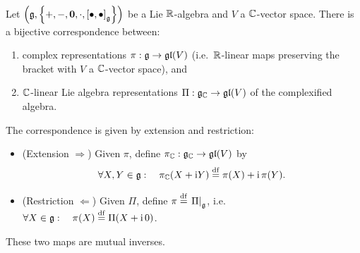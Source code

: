 \documentclass[11pt,reqno]{amsart}
\newcommand{\ii}{\mathrm{i}}
\begin{document}
\begin{Prop}\label{prop:complex-rep-equivalence}
Let $\Br{\g,\set{+,-,\bm0,\cdot,\SqBr{\bullet,\bullet}_\g}}$ be a Lie $\mathbb{R}$-algebra
and $V$ a $\mathbb{C}$-vector space.
There is a bijective correspondence between:
\begin{enumerate}
\item complex representations $\pi:\mathfrak{g}\to\mathfrak{gl}(V)$ (i.e.\ $\mathbb{R}$-linear maps
preserving the bracket with $V$ a $\mathbb{C}$-vector space), and
\item $\mathbb{C}$-linear Lie algebra representations $\Pi:\mathfrak{g}_{\mathbb{C}}\to\mathfrak{gl}(V)$
of the complexified algebra.
\end{enumerate}
The correspondence is given by extension and restriction:
\begin{itemize}
\item (Extension $\Rightarrow$) Given $\pi$, define
$\pi_{\mathbb{C}}:\mathfrak{g}_{\mathbb{C}}\to\mathfrak{gl}(V)$ by
\[
\forall X,Y\in\g:\quad
\pi_\C(X+\ii Y)\df\pi(X)+\ii\,\pi(Y).
\]
\item (Restriction $\Leftarrow$) Given $\Pi$, define
$\pi\df\eval{\Pi}_{\g}$, i.e.\
$\forall X\in\g:\quad\pi(X)\df\Pi(X+\ii\,0)$.
\end{itemize}
These two maps are mutual inverses.
\end{Prop}
\end{document}
